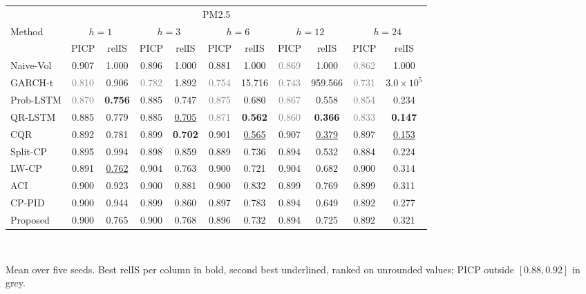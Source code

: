 \begin{table}[!t]
\begin{tabular}{lcccccccccc}\toprule
\multicolumn{11}{c}{PM2.5}\\
Method & \multicolumn{2}{c}{$h=1$} & \multicolumn{2}{c}{$h=3$} & \multicolumn{2}{c}{$h=6$} & \multicolumn{2}{c}{$h=12$} & \multicolumn{2}{c}{$h=24$}\\
 & PICP & relIS & PICP & relIS & PICP & relIS & PICP & relIS & PICP & relIS\\\midrule
Naive-Vol & 0.907 & 1.000 & 0.896 & 1.000 & 0.881 & 1.000 & \textcolor{gray}{0.869} & 1.000 & \textcolor{gray}{0.862} & 1.000\\
GARCH-t & \textcolor{gray}{0.810} & 0.906 & \textcolor{gray}{0.782} & 1.892 & \textcolor{gray}{0.754} & 15.716 & \textcolor{gray}{0.743} & 959.566 & \textcolor{gray}{0.731} & $3.0{\times}10^{5}$\\
Prob-LSTM & \textcolor{gray}{0.870} & \textbf{0.756} & 0.885 & 0.747 & \textcolor{gray}{0.875} & 0.680 & \textcolor{gray}{0.867} & 0.558 & \textcolor{gray}{0.854} & 0.234\\
QR-LSTM & 0.885 & 0.779 & 0.885 & \underline{0.705} & \textcolor{gray}{0.871} & \textbf{0.562} & \textcolor{gray}{0.860} & \textbf{0.366} & \textcolor{gray}{0.833} & \textbf{0.147}\\
CQR & 0.892 & 0.781 & 0.899 & \textbf{0.702} & 0.901 & \underline{0.565} & 0.907 & \underline{0.379} & 0.897 & \underline{0.153}\\
Split-CP & 0.895 & 0.994 & 0.898 & 0.859 & 0.889 & 0.736 & 0.894 & 0.532 & 0.884 & 0.224\\
LW-CP & 0.891 & \underline{0.762} & 0.904 & 0.763 & 0.900 & 0.721 & 0.904 & 0.682 & 0.900 & 0.314\\
ACI & 0.900 & 0.923 & 0.900 & 0.881 & 0.900 & 0.832 & 0.899 & 0.769 & 0.899 & 0.311\\
CP-PID & 0.900 & 0.944 & 0.899 & 0.860 & 0.897 & 0.783 & 0.894 & 0.649 & 0.892 & 0.277\\
Proposed & 0.900 & 0.765 & 0.900 & 0.768 & 0.896 & 0.732 & 0.894 & 0.725 & 0.892 & 0.321\\
\bottomrule\end{tabular}\\[4pt]
\parbox{\linewidth}{\scriptsize Mean over five seeds. Best relIS per column in bold, second best underlined, ranked on unrounded values; PICP outside $[0.88,0.92]$ in grey.}
\end{table}
